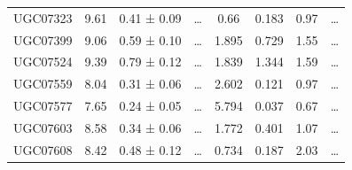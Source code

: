 \documentclass[reprint,%
 amsmath,amssymb,
 aps,
]{revtex4-1}
\begin{document}
\begin{longtable*}{|c|c|c|c|c|c|c|c| }
UGC07323             & 9.61                      & 0.41 ± 0.09           & …                      & 0.66                                                         & 0.183                                                          & 0.97                                                          & …                                                             \\
UGC07399             & 9.06                      & 0.59 ± 0.10           & …                      & 1.895                                                        & 0.729                                                           & 1.55                                                           & …                                                             \\
UGC07524             & 9.39                      & 0.79 ± 0.12           & …                      & 1.839                                                        & 1.344                                                          & 1.59                                                          & …                                                             \\
UGC07559             & 8.04                      & 0.31 ± 0.06           & …                      & 2.602                                                        & 0.121                                                          & 0.97                                                          & …                                                             \\
UGC07577             & 7.65                      & 0.24 ± 0.05           & …                      & 5.794                                                        & 0.037                                                         & 0.67                                                          & …                                                             \\
UGC07603             & 8.58                      & 0.34 ± 0.06           & …                      & 1.772                                                        & 0.401                                                        & 1.07                                                         & …                                                             \\
UGC07608             & 8.42                      & 0.48 ± 0.12           & …                      & 0.734                                                        & 0.187                                                          & 2.03                                                           & …                                                             \\

\end{longtable*}
\end{document}
